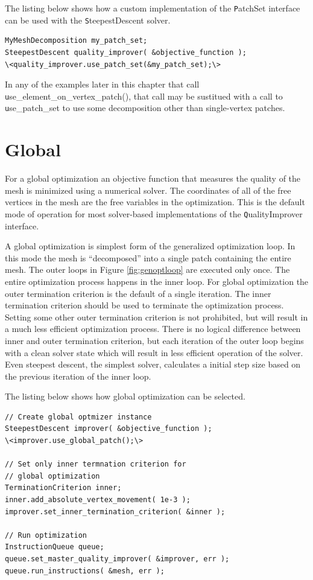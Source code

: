 The listing below shows how a custom implementation of the {\texttt PatchSet} interface can be used with the {\texttt SteepestDescent} solver.

\begin{lstlisting}[frame=single]
MyMeshDecomposition my_patch_set;
SteepestDescent quality_improver( &objective_function );
\<quality_improver.use_patch_set(&my_patch_set);\>
\end{lstlisting}

In any of the examples later in this chapter that call {\texttt use\_element\_on\_vertex\_patch()}, that call may be sustitued with a call to {\texttt use\_patch\_set} to use some decomposition other than single-vertex patches.

\section{Global \label{sec:global}}

For a global optimization an objective function that measures the quality of the mesh is minimized using a numerical solver.  The coordinates of all of the free vertices in the mesh are the free variables in the optimization.  This is the default mode of operation for most solver-based implementations of the {\texttt QualityImprover} interface.

A global optimization is simplest form of the generalized optimization loop.  In this mode the mesh is ``decomposed'' into a single patch containing the entire mesh.  The outer loops in Figure \ref{fig:genoptloop} are executed only once.  The entire optimization process happens in the inner loop.  For global optimization the outer termination criterion is the default of a single iteration.  The inner termination criterion should be used to terminate the optimization process.  Setting some other outer termination criterion is not prohibited, but will result in a much less efficient optimization process.  There is no logical difference between inner and outer termination criterion, but each iteration of the outer loop begins with a clean solver state which will result in less efficient operation of the solver.  Even steepest descent, the simplest solver, calculates a initial step size based on the previous iteration of the inner loop.  

The listing below shows how global optimization can be selected.

\begin{lstlisting}[frame=single]
// Create global optmizer instance
SteepestDescent improver( &objective_function );
\<improver.use_global_patch();\>

// Set only inner termnation criterion for 
// global optimization
TerminationCriterion inner;
inner.add_absolute_vertex_movement( 1e-3 );
improver.set_inner_termination_criterion( &inner );

// Run optimization
InstructionQueue queue;
queue.set_master_quality_improver( &improver, err );
queue.run_instructions( &mesh, err );
\end{lstlisting}

